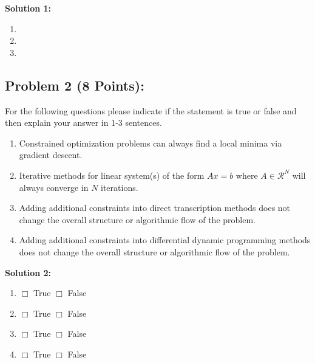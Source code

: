 \documentclass[]{article}
\begin{document}
\textbf{Solution 1:}
\begin{enumerate}[label=(\alph*)]
    \item %
    \item %
    \item %
\end{enumerate}

\clearpage
\subsection*{Problem 2 (8 Points):}
For the following questions please indicate if the statement is true or false and then explain your answer in 1-3 sentences.
\begin{enumerate}[label=(\alph*)]
    \item Constrained optimization problems can always find a local minima via gradient descent.
    \item Iterative methods for linear system(s) of the form $Ax=b$ where $A\in \mathcal{R}^N$ will always converge in $N$ iterations.
    \item Adding additional constraints into direct transcription methods does not change the overall structure or 
    algorithmic flow of the problem.
    \item Adding additional constraints into differential dynamic programming methods does not change the overall structure or algorithmic flow of the problem.
\end{enumerate}

\textbf{Solution 2:}
\begin{enumerate}[label=(\alph*)]
    \item $\Box$ True \quad \quad $\Box$ False \\
    \item $\Box$ True \quad \quad $\Box$ False \\
    \item $\Box$ True \quad \quad $\Box$ False \\
    \item $\Box$ True \quad \quad $\Box$ False \\
    
\end{enumerate}
\end{document}
